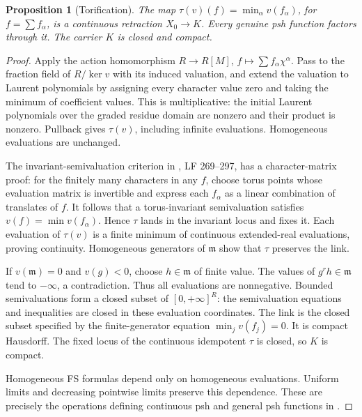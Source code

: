 \documentclass[11pt]{article}
\newtheorem{proposition}{Proposition}
\theoremstyle{remark}
\begin{document}
\begin{proposition}[Torification]
The map $\tau(v)(f)=\min_\alpha v(f_\alpha)$, for $f=\sum f_\alpha$, is a continuous retraction $X_0\to K$. Every genuine psh function factors through it. The carrier $K$ is closed and compact.
\end{proposition}
\begin{proof}
Apply the action homomorphism $R\to R[M]$, $f\mapsto\sum f_\alpha\chi^\alpha$. Pass to the fraction field of $R/\ker v$ with its induced valuation, and extend the valuation to Laurent polynomials by assigning every character value zero and taking the minimum of coefficient values. This is multiplicative: the initial Laurent polynomials over the graded residue domain are nonzero and their product is nonzero. Pullback gives $\tau(v)$, including infinite evaluations. Homogeneous evaluations are unchanged.

The invariant-semivaluation criterion in \cite[Lemma 2.8]{Wu21}, LF 269--297, has a character-matrix proof: for the finitely many characters in any $f$, choose torus points whose evaluation matrix is invertible and express each $f_\alpha$ as a linear combination of translates of $f$. It follows that a torus-invariant semivaluation satisfies $v(f)=\min v(f_\alpha)$. Hence $\tau$ lands in the invariant locus and fixes it. Each evaluation of $\tau(v)$ is a finite minimum of continuous extended-real evaluations, proving continuity. Homogeneous generators of $\mathfrak m$ show that $\tau$ preserves the link.

If $v(\mathfrak m)=0$ and $v(g)<0$, choose $h\in\mathfrak m$ of finite value. The values of $g^rh\in\mathfrak m$ tend to $-\infty$, a contradiction. Thus all evaluations are nonnegative. Bounded semivaluations form a closed subset of $[0,+\infty]^R$: the semivaluation equations and inequalities are closed in these evaluation coordinates. The link is the closed subset specified by the finite-generator equation $\min_jv(f_j)=0$. It is compact Hausdorff. The fixed locus of the continuous idempotent $\tau$ is closed, so $K$ is compact.

Homogeneous FS formulas depend only on homogeneous evaluations. Uniform limits and decreasing pointwise limits preserve this dependence. These are precisely the operations defining continuous psh and general psh functions in \cite{Wu24}.
\end{proof}
\end{document}
